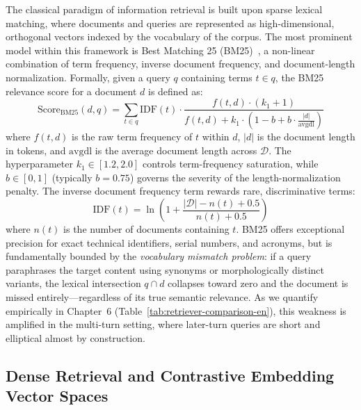 The classical paradigm of information retrieval is built upon sparse lexical matching, where documents and queries are represented as high-dimensional, orthogonal vectors indexed by the vocabulary of the corpus. The most prominent model within this framework is Best Matching 25 (BM25)~\citep{robertson2009probabilistic}, a non-linear combination of term frequency, inverse document frequency, and document-length normalization. Formally, given a query $q$ containing terms $t \in q$, the BM25 relevance score for a document $d$ is defined as:
\begin{equation}
\text{Score}_{\text{BM25}}(d, q) = \sum_{t \in q} \text{IDF}(t) \cdot \frac{f(t,d) \cdot (k_1+1)}{f(t,d) + k_1 \cdot \left(1 - b + b \cdot \frac{|d|}{\text{avgdl}}\right)}
\end{equation}
where $f(t,d)$ is the raw term frequency of $t$ within $d$, $|d|$ is the document length in tokens, and $\text{avgdl}$ is the average document length across $\mathcal{D}$. The hyperparameter $k_1 \in [1.2, 2.0]$ controls term-frequency saturation, while $b \in [0, 1]$ (typically $b{=}0.75$) governs the severity of the length-normalization penalty. The inverse document frequency term rewards rare, discriminative terms:
\begin{equation}
\text{IDF}(t) = \ln\left(1 + \frac{|\mathcal{D}| - n(t) + 0.5}{n(t) + 0.5}\right)
\end{equation}
where $n(t)$ is the number of documents containing $t$. BM25 offers exceptional precision for exact technical identifiers, serial numbers, and acronyms, but is fundamentally bounded by the \textit{vocabulary mismatch problem}: if a query paraphrases the target content using synonyms or morphologically distinct variants, the lexical intersection $q \cap d$ collapses toward zero and the document is missed entirely---regardless of its true semantic relevance. As we quantify empirically in Chapter~6 (Table~\ref{tab:retriever-comparison-en}), this weakness is amplified in the multi-turn setting, where later-turn queries are short and elliptical almost by construction.

\subsection{Dense Retrieval and Contrastive Embedding Vector Spaces}

